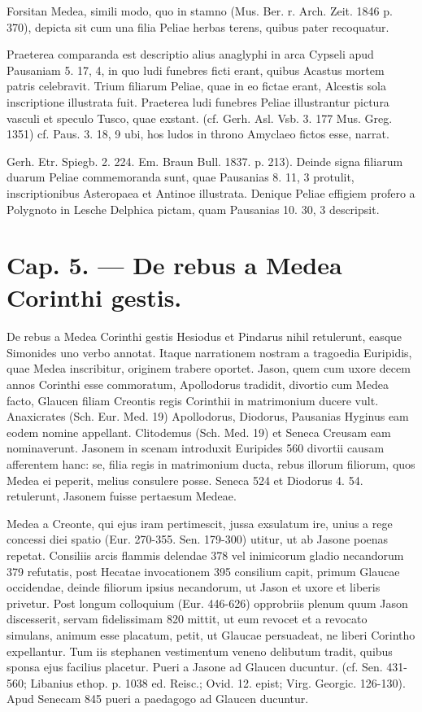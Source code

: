 \documentclass[landscape, a4paper, 11pt, oneside, polutonikogreek, german]{article}
\begin{document}
Forsitan Medea, simili modo, quo in stamno (Mus. Ber. r. Arch. Zeit. 1846 p. 370), depicta sit cum una filia Peliae herbas terens, quibus pater recoquatur.

Praeterea comparanda est descriptio alius anaglyphi in arca Cypseli apud Pausaniam 5. 17, 4, in quo ludi funebres ficti erant, quibus Acastus mortem patris celebravit. Trium filiarum Peliae, quae in eo fictae erant, Alcestis sola inscriptione illustrata fuit. Praeterea ludi funebres Peliae illustrantur pictura vasculi et speculo Tusco, quae exstant. (cf. Gerh. Asl. Vsb. 3. 177 Mus. Greg. 1351) cf. Paus. 3. 18, 9 ubi, hos ludos in throno Amyclaeo fictos esse, narrat.

Gerh. Etr. Spiegb. 2. 224. Em. Braun Bull. 1837. p. 213). Deinde signa filiarum duarum Peliae commemoranda sunt, quae Pausanias 8. 11, 3 protulit, inscriptionibus Asteropaea et Antinoe illustrata. Denique Peliae effigiem profero a Polygnoto in Lesche Delphica pictam, quam Pausanias 10. 30, 3 descripsit.
\clearpage
\section{Cap. 5. --- De rebus a Medea Corinthi gestis.}
\paragraph{}
De rebus a Medea Corinthi gestis Hesiodus et Pindarus nihil retulerunt, easque Simonides uno verbo annotat. Itaque narrationem nostram a tragoedia Euripidis, quae Medea inscribitur, originem trabere oportet. Jason, quem cum uxore decem annos Corinthi esse commoratum, Apollodorus tradidit, divortio cum Medea facto, Glaucen filiam Creontis regis Corinthii in matrimonium ducere vult. Anaxicrates (Sch. Eur. Med. 19) Apollodorus, Diodorus, Pausanias Hyginus eam eodem nomine appellant. Clitodemus (Sch. Med. 19) et Seneca Creusam eam nominaverunt. Jasonem in scenam introduxit Euripides 560 divortii causam afferentem hanc: se, filia regis in matrimonium ducta, rebus illorum filiorum, quos Medea ei peperit, melius consulere posse. Seneca 524 et Diodorus 4. 54. retulerunt, Jasonem fuisse pertaesum Medeae.

Medea a Creonte, qui ejus iram pertimescit, jussa exsulatum ire, unius a rege concessi diei spatio (Eur. 270-355. Sen. 179-300) utitur, ut ab Jasone poenas repetat. Consiliis arcis flammis delendae 378 vel inimicorum gladio necandorum 379 refutatis, post Hecatae invocationem 395 consilium capit, primum Glaucae occidendae, deinde filiorum ipsius necandorum, ut Jason et uxore et liberis privetur. Post longum colloquium (Eur. 446-626) opprobriis plenum quum Jason discesserit, servam fidelissimam 820 mittit, ut eum revocet et a revocato simulans, animum esse placatum, petit, ut Glaucae persuadeat, ne liberi Corintho expellantur. Tum iis stephanen vestimentum veneno delibutum tradit, quibus sponsa ejus facilius placetur. Pueri a Jasone ad Glaucen ducuntur. (cf. Sen. 431-560; Libanius ethop. p. 1038 ed. Reisc.; Ovid. 12. epist; Virg. Georgic. 126-130). Apud Senecam 845 pueri a paedagogo ad Glaucen ducuntur.
\end{document}
